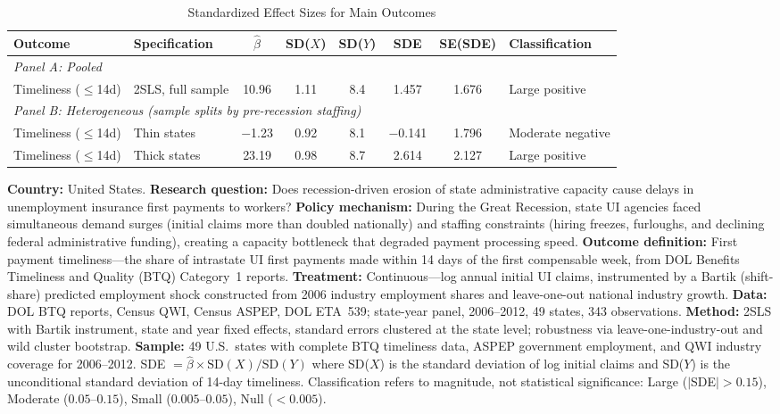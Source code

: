 \begin{table}[H]
\centering
\caption{Standardized Effect Sizes for Main Outcomes}
\label{tab:sde}
\begin{adjustbox}{max width=\textwidth}
\begin{tabular}{llcccccl}
\toprule
Outcome & Specification & $\hat{\beta}$ & SD($X$) & SD($Y$) & SDE & SE(SDE) & Classification \\
\midrule
\multicolumn{8}{l}{\textit{Panel A: Pooled}} \\
Timeliness ($\leq$14d) & 2SLS, full sample & 10.96 & 1.11 & 8.4 & 1.457 & 1.676 & Large positive \\
\midrule
\multicolumn{8}{l}{\textit{Panel B: Heterogeneous (sample splits by pre-recession staffing)}} \\
Timeliness ($\leq$14d) & Thin states & $-$1.23 & 0.92 & 8.1 & $-$0.141 & 1.796 & Moderate negative \\
Timeliness ($\leq$14d) & Thick states & 23.19 & 0.98 & 8.7 & 2.614 & 2.127 & Large positive \\
\bottomrule
\end{tabular}
\end{adjustbox}
\par\vspace{0.3em}
{\footnotesize
\textbf{Country:} United States.
\textbf{Research question:} Does recession-driven erosion of state administrative capacity cause delays in unemployment insurance first payments to workers?
\textbf{Policy mechanism:} During the Great Recession, state UI agencies faced simultaneous demand surges (initial claims more than doubled nationally) and staffing constraints (hiring freezes, furloughs, and declining federal administrative funding), creating a capacity bottleneck that degraded payment processing speed.
\textbf{Outcome definition:} First payment timeliness---the share of intrastate UI first payments made within 14 days of the first compensable week, from DOL Benefits Timeliness and Quality (BTQ) Category~1 reports.
\textbf{Treatment:} Continuous---log annual initial UI claims, instrumented by a Bartik (shift-share) predicted employment shock constructed from 2006 industry employment shares and leave-one-out national industry growth.
\textbf{Data:} DOL BTQ reports, Census QWI, Census ASPEP, DOL ETA~539; state-year panel, 2006--2012, 49 states, 343 observations.
\textbf{Method:} 2SLS with Bartik instrument, state and year fixed effects, standard errors clustered at the state level; robustness via leave-one-industry-out and wild cluster bootstrap.
\textbf{Sample:} 49 U.S.\ states with complete BTQ timeliness data, ASPEP government employment, and QWI industry coverage for 2006--2012.
SDE $= \hat{\beta} \times \text{SD}(X) / \text{SD}(Y)$ where SD($X$) is the standard deviation of log initial claims and SD($Y$) is the unconditional standard deviation of 14-day timeliness.
Classification refers to magnitude, not statistical significance:
Large ($|$SDE$| > 0.15$), Moderate ($0.05$--$0.15$), Small ($0.005$--$0.05$), Null ($< 0.005$).}
\end{table}
